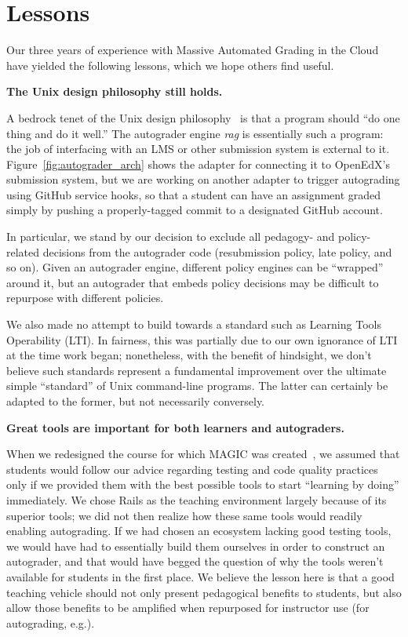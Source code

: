 \section{Lessons}

Our three years of experience with Massive Automated Grading in the
Cloud have yielded the following lessons, which we hope others find
useful.

\textbf{The Unix design philosophy still holds.}

A bedrock tenet of the Unix design
philosophy~\cite{unix-programming-environment} is that a program should
``do one thing and do it well.''  The autograder engine \emph{rag}\/ is
essentially such a program: the job of interfacing with an LMS or other
submission system is external to it.  Figure~\ref{fig:autograder_arch}
shows the adapter for connecting it to OpenEdX's submission system, but
we are working on another adapter to trigger autograding using GitHub
service hooks, so that a student can have an assignment graded simply by
pushing a properly-tagged commit to a designated GitHub account.

In particular, we stand by our decision to exclude all pedagogy- and
policy-related decisions from the autograder code (resubmission policy,
late policy, and so on).  Given an autograder engine, different policy
engines can be ``wrapped'' around it, but an autograder that embeds
policy decisions may be difficult to repurpose with different policies.

We also made no attempt to build towards a standard such as Learning
Tools Operability (LTI).  In fairness, this was partially due to our own
ignorance of LTI at the time work began; nonetheless, with the benefit
of hindsight, we don't believe such standards represent a fundamental
improvement over the ultimate simple ``standard'' of Unix command-line
programs.  The latter can certainly be adapted to the former, but not
necessarily conversely.

\textbf{Great tools are important for both learners and autograders.}

When we redesigned the course for which MAGIC was
created~\cite{crossing_the_software_chasm}, we assumed that students
would follow our advice regarding testing and code quality practices
only if we provided them with the best possible tools to start
``learning by doing'' immediately.
We chose Rails as the teaching environment largely because of its
superior tools; we did not then realize how these same tools would
readily enabling autograding.
If we had chosen an ecosystem lacking good testing tools, we would have
had to essentially build them ourselves in order to construct an
autograder, and that would have begged the question of why the tools
weren't available for students in the first place.
We believe the lesson here is that a good teaching vehicle should
not only present pedagogical benefits to students, but also allow those
benefits to be amplified when repurposed for instructor use (for
autograding, e.g.).


